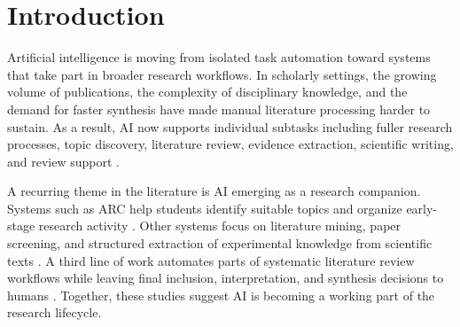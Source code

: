 \documentclass[sn-basic,Numbered]{sn-jnl}
\begin{document}
\let\thefootnote\relax{}

\section{Introduction}
\label{sec:introduction}

Artificial intelligence is moving from isolated task automation toward
systems that take part in broader research workflows. In scholarly
settings, the growing volume of publications, the complexity of
disciplinary knowledge, and the demand for faster synthesis have made
manual literature processing harder to sustain. As a result, AI now
supports individual subtasks including fuller research processes,
topic discovery, literature review, evidence extraction,
scientific writing, and review support
\cite{vishnumolakala2024arc,lian2025literature,bolanos2024ailitreview}.

A recurring theme in the literature is AI emerging as a research
companion. Systems such as ARC help students identify suitable topics and organize early-stage
research activity \cite{vishnumolakala2024arc}. Other systems focus on
literature mining, paper screening, and structured extraction of
experimental knowledge from scientific texts
\cite{lian2025literature}. A third line of work automates parts of
systematic literature review workflows while leaving final inclusion,
interpretation, and synthesis decisions to humans
\cite{bolanos2024ailitreview}. Together, these studies suggest AI is
becoming a working part of the research lifecycle.
\end{document}
